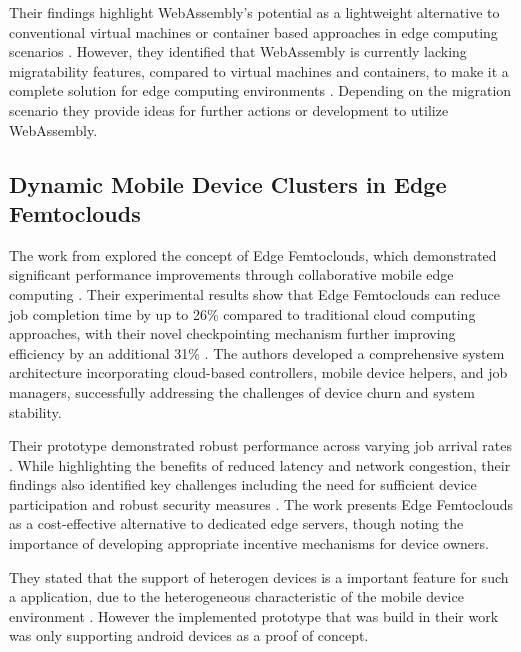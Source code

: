 Their findings highlight WebAssembly's potential as a lightweight alternative to conventional virtual machines or container based approaches in edge computing scenarios \cite{relatedwork:wasmedgecomputing}. However, they identified that WebAssembly is currently lacking migratability features, compared to virtual machines and containers, to make it a complete solution for edge computing environments \cite{relatedwork:wasmedgecomputing}. Depending on the migration scenario they provide ideas for further actions or development to utilize WebAssembly.

\subsection{Dynamic Mobile Device Clusters in
Edge Femtoclouds}
The work from \citeauthor{relatedwork:mobilecloud} \cite{relatedwork:mobilecloud} explored the concept of Edge Femtoclouds, which demonstrated significant performance improvements through collaborative mobile edge computing \cite{relatedwork:mobilecloud}. Their experimental results show that Edge Femtoclouds can reduce job completion time by up to 26\% compared to traditional cloud computing approaches, with their novel checkpointing mechanism further improving efficiency by an additional 31\% \cite{relatedwork:mobilecloud}. The authors developed a comprehensive system architecture incorporating cloud-based controllers, mobile device helpers, and job managers, successfully addressing the challenges of device churn and system stability. 

Their prototype demonstrated robust performance across varying job arrival rates \cite{relatedwork:mobilecloud}. While highlighting the benefits of reduced latency and network congestion, their findings also identified key challenges including the need for sufficient device participation and robust security measures \cite{relatedwork:mobilecloud}. The work presents Edge Femtoclouds as a cost-effective alternative to dedicated edge servers, though noting the importance of developing appropriate incentive mechanisms for device owners.

They stated that the support of heterogen devices is a important feature for such a application, due to the heterogeneous characteristic of the mobile device environment \cite{relatedwork:mobilecloud}. However the implemented prototype that was build in their work was only supporting android devices as a proof of concept.